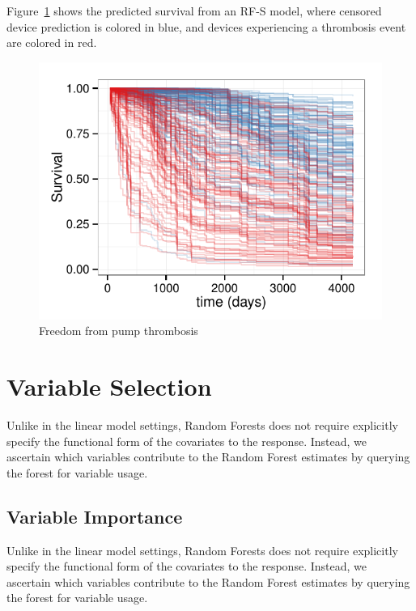 \documentclass[nojss]{jss}\usepackage[]{graphicx}\usepackage[]{color}
\makeatletter
\def\maxwidth{ %
  \ifdim\Gin@nat@width>\linewidth
    \linewidth
  \else
    \Gin@nat@width
  \fi
}
\newenvironment{knitrout}{}{} %
\makeatother
\begin{document}
Figure~\ref{fig:rfsrc-plot} shows the predicted survival from an RF-S model, where censored device prediction is colored in blue, and devices experiencing a thrombosis event are colored in red.  
\begin{knitrout}\footnotesize
{}\color{fgcolor}\begin{figure}[!htpb]

{\centering \includegraphics[width=\maxwidth]{figure/rfs-rfsrc-plot-1} 

}

\caption[Freedom from pump thrombosis]{Freedom from pump thrombosis\label{fig:rfsrc-plot}}
\end{figure}


\end{knitrout}

\section{Variable Selection}
Unlike in the linear model settings, Random Forests does not require explicitly specify the functional form of the covariates to the response. Instead, we ascertain which variables contribute to the Random Forest estimates by querying the forest for variable usage. 

\subsection{Variable Importance}\label{S:vimp}
Unlike in the linear model settings, Random Forests does not require explicitly specify the functional form of the covariates to the response. Instead, we ascertain which variables contribute to the Random Forest estimates by querying the forest for variable usage. 
\end{document}

